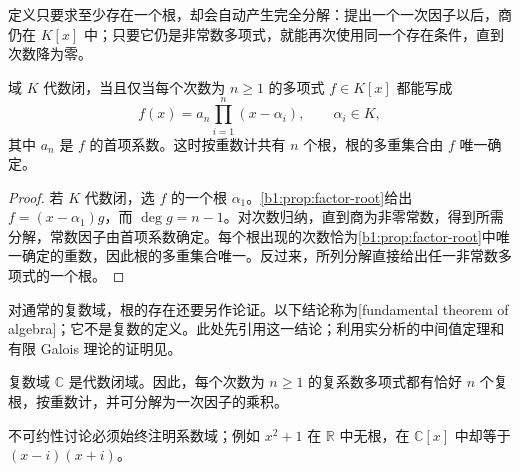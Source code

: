 定义只要求至少存在一个根，却会自动产生完全分解：提出一个一次因子以后，商仍在 \(K[x]\) 中；只要它仍是非常数多项式，就能再次使用同一个存在条件，直到次数降为零。

\begin{proposition}\label{b1:prop:algebraically-closed-splitting}
	域 \(K\) 代数闭，当且仅当每个次数为 \(n\ge1\) 的多项式 \(f\in K[x]\) 都能写成
	\[
		f(x)=a_n\prod_{i=1}^n(x-\alpha_i),\qquad \alpha_i\in K,
	\]
	其中 \(a_n\) 是 \(f\) 的首项系数。这时按重数计共有 \(n\) 个根，根的多重集合由 \(f\) 唯一确定。
\end{proposition}
\begin{proof}
	若 \(K\) 代数闭，选 \(f\) 的一个根 \(\alpha_1\)。\cref{b1:prop:factor-root}给出 \(f=(x-\alpha_1)g\)，而 \(\deg g=n-1\)。对次数归纳，直到商为非零常数，得到所需分解，常数因子由首项系数确定。每个根出现的次数恰为\cref{b1:prop:factor-root}中唯一确定的重数，因此根的多重集合唯一。反过来，所列分解直接给出任一非常数多项式的一个根。
\end{proof}

对通常的复数域，根的存在还要另作论证。以下结论称为[fundamental theorem of algebra]；它不是复数的定义。此处先引用这一结论；利用实分析的中间值定理和有限 Galois 理论的证明见。

\begin{theorem}[代数基本定理]\label{b1:thm:fundamental-theorem-algebra}
	复数域 \(\mathbb C\) 是代数闭域。因此，每个次数为 \(n\ge1\) 的复系数多项式都有恰好 \(n\) 个复根，按重数计，并可分解为一次因子的乘积。
\end{theorem}

不可约性讨论必须始终注明系数域；例如 \(x^2+1\) 在 \(\mathbb R\) 中无根，在 \(\mathbb C[x]\) 中却等于 \((x-i)(x+i)\)。
